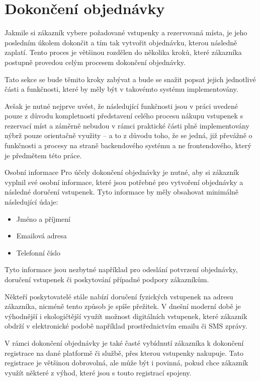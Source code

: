 \section{Dokončení objednávky}
\label{sec:identifikace-dokonceni-objednavky}
Jakmile si zákazník vybere požadované vstupenky a rezervovaná místa, je jeho posledním úkolem dokončit a tím tak vytvořit objednávku, kterou následně zaplatí.
Tento proces je většinou rozdělen do několika kroků, které zákazníka postupně provedou celým procesem dokončení objednávky.

Tato sekce se bude těmito kroky zabývat a bude se snažit popsat jejich jednotlivé části a funkčnosti, které by měly být v takovémto systému implementovány.

Avšak je nutné nejprve uvést, že následující funkčnosti jsou v práci uvedené pouze z důvodu kompletnosti představení celého procesu nákupu vstupenek s rezervací míst a záměrně nebudou v rámci praktické části plně implementovány nýbrž pouze orientačně využity – a to z důvodu toho, že se jedná, již převážně o funkčnosti a procesy na straně backendového systému a ne frontendového, který je předmětem této práce.

\begin{subsection}{Osobní informace}
    \label{subsec:identifikace-dokonceni-objednavky-osobni-informace}
    Pro účely dokončení objednávky je nutné, aby si zákazník vyplnil své osobní informace, které jsou potřebné pro vytvoření objednávky a následné doručení vstupenek.
    Tyto informace by měly obsahovat minimálně následující údaje:

    \begin{itemize}
        \item Jméno a příjmení
        \item Emailová adresa
        \item Telefonní číslo
    \end{itemize}

    Tyto informace jsou nezbytné například pro odeslání potvrzení objednávky, doručení vstupenek či poskytování případné podpory zákazníkům.

    Někteří poskytovatelé stále nabízí doručení fyzických vstupenek na adresu zákazníka, nicméně tento způsob je spíše přežitek.
    V dnešní moderní době je výhodnější i ekologičtější využít možnost digitálních vstupenek, které zákazník obdrží v elektronické podobě například prostřednictvím emailu či SMS zprávy.

    V rámci dokončení objednávky je také časté vybídnutí zákazníka k dokončení registrace na dané platformě či službě, přes kterou vstupenky nakupuje.
    Tato registrace je většinou dobrovolná, ale může být i povinná, pokud chce zákazník využít některé z výhod, které jsou s touto registrací spojeny.
\end{subsection}

